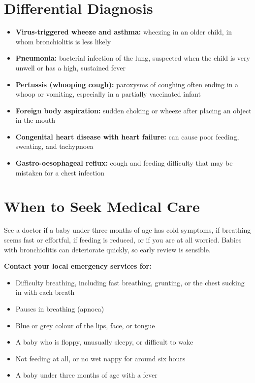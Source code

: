 \section*{Differential Diagnosis}
\begin{itemize}
    \item \textbf{Virus-triggered wheeze and asthma:} wheezing in an older child, in whom bronchiolitis is less likely
    \item \textbf{Pneumonia:} bacterial infection of the lung, suspected when the child is very unwell or has a high, sustained fever
    \item \textbf{Pertussis (whooping cough):} paroxysms of coughing often ending in a whoop or vomiting, especially in a partially vaccinated infant
    \item \textbf{Foreign body aspiration:} sudden choking or wheeze after placing an object in the mouth
    \item \textbf{Congenital heart disease with heart failure:} can cause poor feeding, sweating, and tachypnoea
    \item \textbf{Gastro-oesophageal reflux:} cough and feeding difficulty that may be mistaken for a chest infection
\end{itemize}

\section*{When to Seek Medical Care}
See a doctor if a baby under three months of age has cold symptoms, if breathing seems fast or effortful, if feeding is reduced, or if you are at all worried. Babies with bronchiolitis can deteriorate quickly, so early review is sensible.

\textbf{Contact your local emergency services for:}
\begin{itemize}
    \item Difficulty breathing, including fast breathing, grunting, or the chest sucking in with each breath
    \item Pauses in breathing (apnoea)
    \item Blue or grey colour of the lips, face, or tongue
    \item A baby who is floppy, unusually sleepy, or difficult to wake
    \item Not feeding at all, or no wet nappy for around six hours
    \item A baby under three months of age with a fever
\end{itemize}

